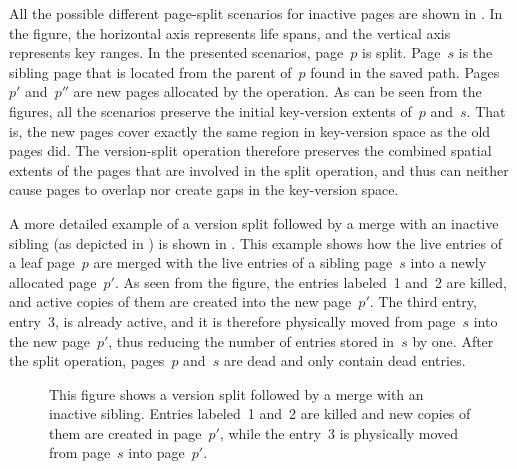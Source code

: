 All the possible different page-split scenarios for inactive pages are shown
in . 
In the figure, the horizontal axis represents life spans, and the
vertical axis represents key ranges. 
In the presented scenarios, page~$p$ is split. 
Page~$s$ is the sibling page that is located from the parent of~$p$
found in the saved path.
Pages~$p'$ and~$p''$ are new pages allocated by the operation. 
As can be seen from the figures, all the scenarios preserve the
initial key-version extents of~$p$ and~$s$.
That is, the new pages cover exactly the same region in key-version
space as the old pages did. 
The version-split operation therefore preserves the combined spatial extents
of the pages that are involved in the split operation, and thus can neither
cause pages to overlap nor create gaps in the key-version space. 

A more detailed example of a version split followed by a merge with an inactive
sibling (as depicted in ) is shown in
.
This example shows how the live entries of a leaf page~$p$ are merged with the
live entries of a sibling page~$s$ into a newly allocated page~$p'$.
As seen from the figure, the entries labeled~\num{1} and~\num{2} are killed,
and active copies of them are created into the new page~$p'$.
The third entry, entry~\num{3}, is already active, and it is therefore
physically moved from page~$s$ into the new page~$p'$, thus reducing the number
of entries stored in~$s$ by one.
After the split operation, pages~$p$ and~$s$ are dead and only contain dead
entries.

\begin{figure}[!htb]
\begin{center}
  
  {This figure shows a version split followed by a merge with an inactive
  sibling. 
  Entries labeled~{1} and~{2} are killed and new copies of them are
  created in page~$p'$, while the entry~\num{3} is physically moved
  from page~$s$ into page~$p'$.}
  \label{fig:split-imi1-example}
\end{center}
\end{figure}

